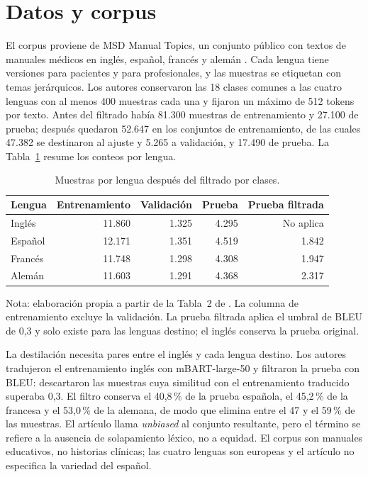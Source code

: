 \section{Datos y corpus}
\label{sec:datos}

El corpus proviene de MSD Manual Topics, un conjunto público con textos de manuales médicos en inglés, español, francés y alemán \cite{piperno2025}. Cada lengua tiene versiones para pacientes y para profesionales, y las muestras se etiquetan con temas jerárquicos. Los autores conservaron las 18 clases comunes a las cuatro lenguas con al menos 400 muestras cada una y fijaron un máximo de 512 tokens por texto. Antes del filtrado había 81.300 muestras de entrenamiento y 27.100 de prueba; después quedaron 52.647 en los conjuntos de entrenamiento, de las cuales 47.382 se destinaron al ajuste y 5.265 a validación, y 17.490 de prueba. La Tabla~\ref{tab:corpus} resume los conteos por lengua.

\begin{table}[H]
\centering
\caption{Muestras por lengua después del filtrado por clases.}
\label{tab:corpus}
\small
\setlength{\tabcolsep}{4pt}
\begin{tabular}{@{}lrrrr@{}}
\toprule
Lengua & Entrenamiento & Validación & Prueba & Prueba filtrada \\
\midrule
Inglés  & 11.860 & 1.325 & 4.295 & No aplica \\
Español & 12.171 & 1.351 & 4.519 & 1.842 \\
Francés & 11.748 & 1.298 & 4.308 & 1.947 \\
Alemán  & 11.603 & 1.291 & 4.368 & 2.317 \\
\bottomrule
\end{tabular}

\vspace{4pt}
{\footnotesize Nota: elaboración propia a partir de la Tabla~2 de \cite{piperno2025}. La columna de entrenamiento excluye la validación. La prueba filtrada aplica el umbral de BLEU de 0,3 y solo existe para las lenguas destino; el inglés conserva la prueba original.}
\end{table}

La destilación necesita pares entre el inglés y cada lengua destino. Los autores tradujeron el entrenamiento inglés con mBART-large-50 \cite{liu2020} y filtraron la prueba con BLEU: descartaron las muestras cuya similitud con el entrenamiento traducido superaba 0,3. El filtro conserva el 40,8\,\% de la prueba española, el 45,2\,\% de la francesa y el 53,0\,\% de la alemana, de modo que elimina entre el 47 y el 59\,\% de las muestras. El artículo llama \textit{unbiased} al conjunto resultante, pero el término se refiere a la ausencia de solapamiento léxico, no a equidad. El corpus son manuales educativos, no historias clínicas; las cuatro lenguas son europeas y el artículo no especifica la variedad del español.
